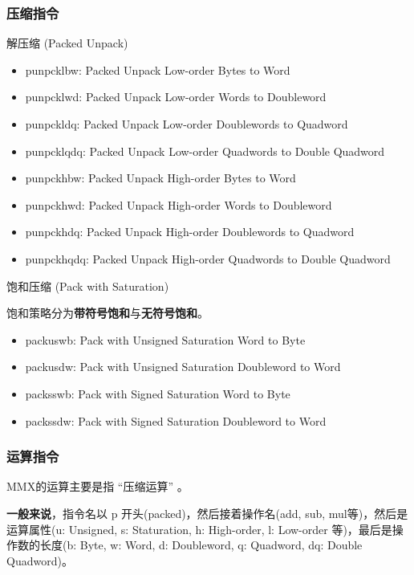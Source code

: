 \subsubsection{压缩指令}

解压缩 (Packed Unpack)


\begin{itemize}
    \item punpcklbw: Packed Unpack Low-order Bytes to Word 
    \item punpcklwd: Packed Unpack Low-order Words to Doubleword
    \item punpckldq: Packed Unpack Low-order Doublewords to Quadword
    \item punpcklqdq: Packed Unpack Low-order Quadwords to Double Quadword
    \item punpckhbw: Packed Unpack High-order Bytes to Word 
    \item punpckhwd: Packed Unpack High-order Words to Doubleword
    \item punpckhdq: Packed Unpack High-order Doublewords to Quadword
    \item punpckhqdq: Packed Unpack High-order Quadwords to Double Quadword
\end{itemize}

饱和压缩 (Pack with Saturation)

饱和策略分为\textbf{带符号饱和}与\textbf{无符号饱和}。

\begin{itemize}
    \item packuswb: Pack with Unsigned Saturation Word to Byte
    \item packusdw: Pack with Unsigned Saturation Doubleword to Word
    \item packsswb: Pack with Signed Saturation Word to Byte
    \item packssdw: Pack with Signed Saturation Doubleword to Word
\end{itemize}

\subsubsection{运算指令}

MMX的运算主要是指 “压缩运算” 。

\textbf{一般来说}，指令名以 p 开头(packed)，然后接着操作名(add, sub, mul等)，然后是运算属性(u: Unsigned, s: Staturation, h: High-order, l: Low-order 等)，最后是操作数的长度(b: Byte, w: Word, d: Doubleword, q: Quadword, dq: Double Quadword)。

